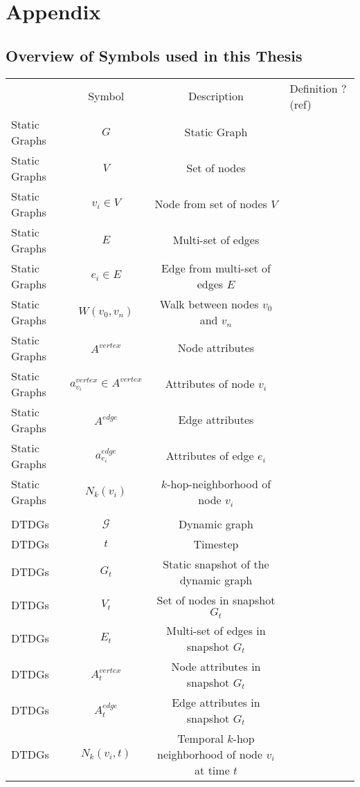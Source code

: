 \section{Appendix}

\iffalse
\subsection{Overview of Symbols used in this Thesis}
\label{s_Appendix_Symbols}

\begin{table}[ht]
    \centering
    \begin{tabular}{lccl}
          &Symbol& Description &Definition ? (ref)\\
          Static Graphs&$G$&  Static Graph&\\
          Static Graphs&$V$&  Set of nodes&\\
          Static Graphs&$v_i \in V$&  Node from set of nodes $V$&\\
          Static Graphs&$E$&  Multi-set of edges&\\
          Static Graphs&$e_i \in E$&  Edge from multi-set of edges $E$&\\
          Static Graphs&$W(v_0, v_n)$&  Walk between nodes $v_0$ and $v_n$&\\
          Static Graphs&$A^{vertex}$&  Node attributes&\\
          Static Graphs&$a^{vertex}_{v_i} \in A^{vertex}$&  Attributes of node $v_i$&\\
          Static Graphs&$A^{edge}$&  Edge attributes&\\
 Static Graphs& $a^{edge}_{e_i}$& Attributes of edge $e_i$&\\
 Static Graphs& $N_k(v_i)$& $k$-hop-neighborhood of node $v_i$&\\
 & & &\\
 DTDGs& $\mathcal{G}$& Dynamic graph&\\
 DTDGs& $t$& Timestep&\\
 DTDGs& $G_t$& Static snapshot of the dynamic graph&\\
 DTDGs& $V_t$& Set of nodes in snapshot $G_t$&\\
 DTDGs& $E_t$& Multi-set of edges in snapshot $G_t$&\\
 DTDGs& $A^{vertex}_t$& Node attributes in snapshot $G_t$&\\
 DTDGs& $A_t^{edge}$& Edge attributes in snapshot $G_t$&\\
 DTDGs& $N_k(v_i, t)$& Temporal $k$-hop neighborhood of node $v_i$ at time $t$&\\

\end{tabular}
\end{table}
